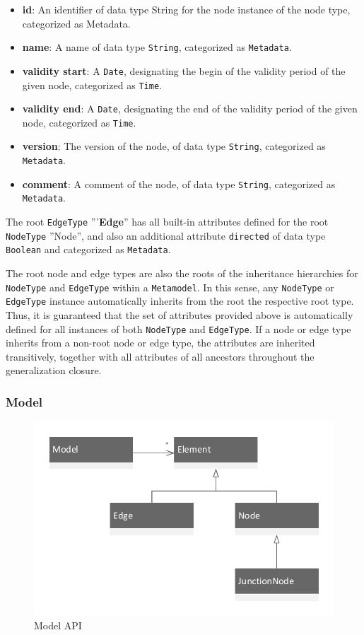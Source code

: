 \begin{itemize}
\item \textbf{id}: An identifier of data type String for the node instance of the node type, categorized as Metadata.
\item \textbf{name}: A name of data type \texttt{String}, categorized as \texttt{Metadata}.
\item \textbf{validity start}: A \texttt{Date}, designating the begin of the validity period of the given node, categorized as \texttt{Time}.
\item \textbf{validity end}: A \texttt{Date}, designating the end of the validity period of the given node, categorized as \texttt{Time}.
\item \textbf{version}: The version of the node, of data type \texttt{String}, categorized as \texttt{Metadata}.
\item \textbf{comment}: A comment of the node, of data type \texttt{String}, categorized as \texttt{Meta\-data}.
\end{itemize}

The root \texttt{EdgeType} '''\textbf{Edge}'' has all built-in attributes defined for the root \texttt{NodeType} ''Node'', and also an additional attribute \texttt{directed} of data type \texttt{Boolean} and categorized as \texttt{Metadata}. 

The root node and edge types are also the roots of the inheritance hierarchies for \texttt{NodeType} and \texttt{EdgeType} within a \texttt{Metamodel}. In this sense, any \texttt{NodeType} or \texttt{EdgeType} instance automatically inherits from the root the respective root type. Thus, it is guaranteed that the set of attributes provided above is automatically defined for all instances of both \texttt{NodeType} and \texttt{EdgeType}. If a node or edge type inherits from a non-root node or edge type, the attributes are inherited transitively, together with all attributes of all ancestors throughout the generalization closure.

\subsubsection{Model}

\begin{figure}
\centering
\includegraphics[scale=0.75]{figures/model.pdf}
\caption{Model API}
\label{fig:model}
\end{figure}

